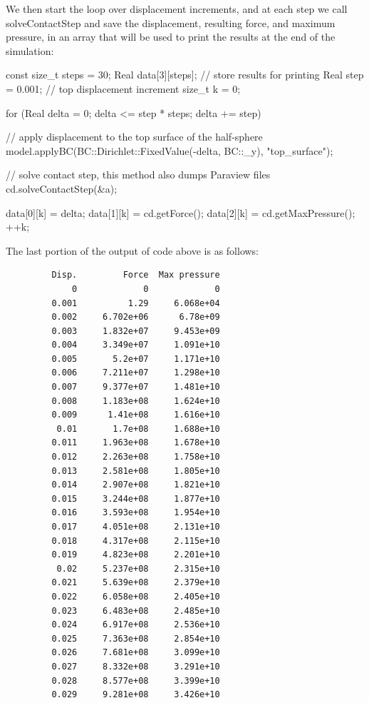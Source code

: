 We then start the loop over displacement increments, and at each step we call {{{solveContactStep}}} and save the displacement, resulting force, and maximum pressure, in an array that will be used to print the results at the end of the simulation:
\begin{cpp}

  const size_t steps = 30;
  Real data[3][steps]; // store results for printing
  Real step = 0.001;  // top displacement increment
  size_t k = 0;

  for (Real delta = 0; delta <= step * steps; delta += step) {
    // apply displacement to the top surface of the half-sphere
    model.applyBC(BC::Dirichlet::FixedValue(-delta, BC::_y), "top_surface");

    // solve contact step, this method also dumps Paraview files
    cd.solveContactStep(&a);

    data[0][k] = delta;
    data[1][k] = cd.getForce();
    data[2][k] = cd.getMaxPressure();
    ++k;
  }
\end{cpp}


The last portion of the output of code above is as follows:
\begin{verbatim}
         Disp.         Force  Max pressure
             0             0             0
         0.001          1.29     6.068e+04
         0.002     6.702e+06      6.78e+09
         0.003     1.832e+07     9.453e+09
         0.004     3.349e+07     1.091e+10
         0.005       5.2e+07     1.171e+10
         0.006     7.211e+07     1.298e+10
         0.007     9.377e+07     1.481e+10
         0.008     1.183e+08     1.624e+10
         0.009      1.41e+08     1.616e+10
          0.01       1.7e+08     1.688e+10
         0.011     1.963e+08     1.678e+10
         0.012     2.263e+08     1.758e+10
         0.013     2.581e+08     1.805e+10
         0.014     2.907e+08     1.821e+10
         0.015     3.244e+08     1.877e+10
         0.016     3.593e+08     1.954e+10
         0.017     4.051e+08     2.131e+10
         0.018     4.317e+08     2.115e+10
         0.019     4.823e+08     2.201e+10
          0.02     5.237e+08     2.315e+10
         0.021     5.639e+08     2.379e+10
         0.022     6.058e+08     2.405e+10
         0.023     6.483e+08     2.485e+10
         0.024     6.917e+08     2.536e+10
         0.025     7.363e+08     2.854e+10
         0.026     7.681e+08     3.099e+10
         0.027     8.332e+08     3.291e+10
         0.028     8.577e+08     3.399e+10
         0.029     9.281e+08     3.426e+10
\end{verbatim}

